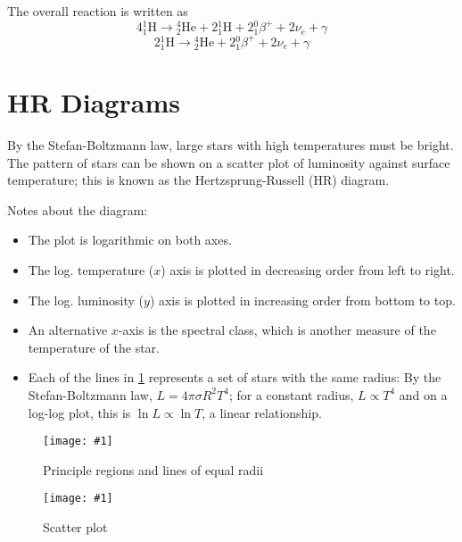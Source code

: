 \documentclass[a4paper,12pt]{article}
\let\oldsection\section
\renewcommand\section{\clearpage\oldsection}
\newcommand{\img}[4]{\begin{center}
  \begin{figure}[H]
    \centering
    \texttt{[image: \#1]}
    \caption{#3}
    \label{fig:#4}
  \end{figure}
\end{center}}
\newcommand{\atom}[3]{{}^{#1}_{#2}\text{#3}}
\begin{document}
\pagebreak

The overall reaction is written as
$$4\atom{1}{1}{H} \rightarrow \atom{4}{2}{He} + 2\atom{1}{1}{H} + 2\atom{0}{1}{$\beta$}^{+} + 2\nu_e + \gamma$$
$$2\atom{1}{1}{H} \rightarrow \atom{4}{2}{He} + 2\atom{0}{1}{$\beta$}^{+} + 2\nu_e + \gamma$$


\section{HR Diagrams}

By the Stefan-Boltzmann law, large stars with high temperatures must be bright. The pattern of stars can be shown on a scatter plot of luminosity against surface temperature; this is known as the Hertzsprung-Russell (HR) diagram.

Notes about the diagram:
\begin{itemize}
  \item The plot is logarithmic on both axes.
  \item The log. temperature ($x$) axis is plotted in decreasing order from left to right.
  \item The log. luminosity ($y$) axis is plotted in increasing order from bottom to top.
  \item An alternative $x$-axis is the spectral class, which is another measure of the temperature of the star.
  \item Each of the lines in \cref{fig:HR} represents a set of stars with the same radius: By the Stefan-Boltzmann law, $L = 4\pi\sigma R^2T^4$; for a constant radius, $L\propto T^4$ and on a log-log plot, this is $\ln L \propto \ln T$, a linear relationship.
\end{itemize}

\begin{minipage}{0.5\textwidth}
  \img{hr1.png}{1}{Principle regions and lines of equal radii}{HR}
\end{minipage}%
\begin{minipage}{0.5\textwidth}
  \img{hr2.png}{1}{Scatter plot}{HR2}
\end{minipage}%

\pagebreak
\end{document}

